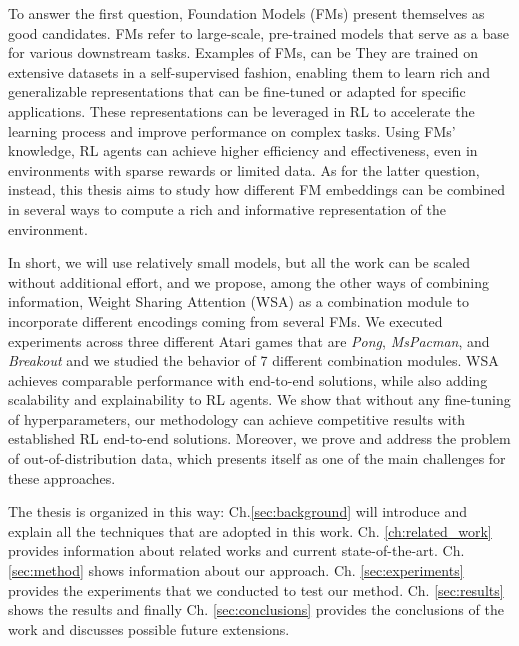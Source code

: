 To answer the first question, Foundation Models (FMs) present themselves as good candidates.
FMs refer to large-scale, pre-trained models that serve as a base for various downstream tasks.
Examples of FMs, can be \citet{brown2020language, devlin2018bert, he2016deep}
They are trained on extensive datasets in a self-supervised fashion, enabling them to learn rich and generalizable representations that can be fine-tuned or adapted for specific applications. 
These representations can be leveraged in RL to accelerate the learning process and improve performance on complex tasks. Using FMs' knowledge, RL agents can achieve higher efficiency and effectiveness, even in environments with sparse rewards or limited data. 
As for the latter question, instead, this thesis aims to study how different FM embeddings can be combined in several ways to compute a rich and informative representation of the environment. 


In short, we will use relatively small models, but all the work can be scaled without additional effort, and we propose, among the other ways of combining information, Weight Sharing Attention (WSA) as a combination module to incorporate different encodings coming from several FMs.
We executed experiments across three different Atari games that are \textit{Pong}, \textit{MsPacman}, and \textit{Breakout} and we studied the behavior of 7 different combination modules.
WSA achieves comparable performance with end-to-end solutions, while also adding scalability and explainability to RL agents.
We show that without any fine-tuning of hyperparameters, our methodology can achieve competitive results with established RL end-to-end solutions. Moreover, we prove and address the problem of out-of-distribution data, which presents itself as one of the main challenges for these approaches. 


The thesis is organized in this way: Ch.\ref{sec:background} will introduce and explain all the techniques that are adopted in this work. Ch. \ref{ch:related_work} provides information about related works and current state-of-the-art. Ch. \ref{sec:method} shows information about our approach. Ch. \ref{sec:experiments} provides the experiments that we conducted to test our method. Ch. \ref{sec:results} shows the results and finally Ch. \ref{sec:conclusions} provides the conclusions of the work and discusses possible future extensions.
